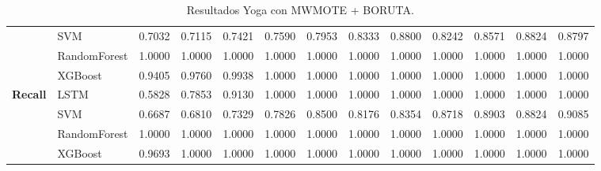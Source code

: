 \begin{table}[h]
\begin{adjustbox}{max width=15cm}
\begin{tabular}{|c|l|r|r|r|r|r|r|r|r|r|r|r|}
			& SVM &  0.7032 &  0.7115 &  0.7421 &  0.7590 &  0.7953 &  0.8333 &  0.8800 &  0.8242 &  0.8571 &  0.8824 &  0.8797 \\
			& RandomForest &  1.0000 &  1.0000 &  1.0000 &  1.0000 &  1.0000 &  1.0000 &  1.0000 &  1.0000 &  1.0000 &  1.0000 &  1.0000 \\
			& XGBoost &  0.9405 &  0.9760 &  0.9938 &  1.0000 &  1.0000 &  1.0000 &  1.0000 &  1.0000 &  1.0000 &  1.0000 &  1.0000 \\
			\hline
			\textbf{Recall} & LSTM &  0.5828 &  0.7853 &  0.9130 &  1.0000 &  1.0000 &  1.0000 &  1.0000 &  1.0000 &  1.0000 &  1.0000 &  1.0000 \\
			& SVM &  0.6687 &  0.6810 &  0.7329 &  0.7826 &  0.8500 &  0.8176 &  0.8354 &  0.8718 &  0.8903 &  0.8824 &  0.9085 \\
			& RandomForest &  1.0000 &  1.0000 &  1.0000 &  1.0000 &  1.0000 &  1.0000 &  1.0000 &  1.0000 &  1.0000 &  1.0000 &  1.0000 \\
			& XGBoost &  0.9693 &  1.0000 &  1.0000 &  1.0000 &  1.0000 &  1.0000 &  1.0000 &  1.0000 &  1.0000 &  1.0000 &  1.0000 \\
			\hline
		\end{tabular}
	\end{adjustbox}
	\caption{Resultados Yoga con MWMOTE + BORUTA.}
	\label{tab:Yoga_MWMOTE_BORUTA}
\end{table}
\newpage

